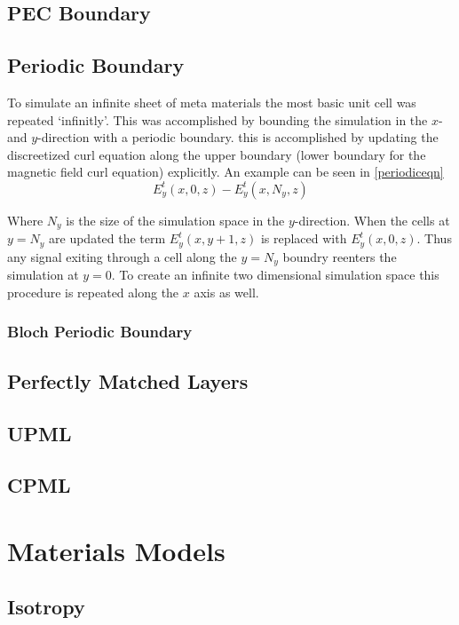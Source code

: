 \documentclass[./JimHeneghanDissertation.tex]{subfiles}
\begin{document}
			\subsection{PEC Boundary}

			\subsection{Periodic Boundary}
				To simulate an infinite sheet of meta materials the most basic unit cell was repeated `infinitly'. This was accomplished by bounding the simulation in the $x$- and $y$-direction with a periodic boundary. this is accomplished by updating the discreetized curl equation along the upper boundary (lower boundary for the magnetic field curl equation) explicitly. An example can be seen in \eqref{periodiceqn}
			\begin{equation} \label{periodiceqn}
				E_{y}^{t}(x,0,z) - E_{y}^{t}(x,N_{y},z)
			\end{equation}

				Where $N_{y}$ is the size of the simulation space in the $y$-direction. When the cells at $y=N_{y}$ are updated the term $E_{y}^{t}(x,y+1,z)$ is replaced with $E_{y}^{t}(x,0,z)$. Thus any signal exiting through a cell along the $y=N_{y}$ boundry reenters the simulation at $y=0$. To create an infinite two dimensional simulation space this procedure is repeated along the $x$ axis as well. 

				\subsubsection{Bloch Periodic Boundary}
			\subsection{Perfectly Matched Layers}
			
				\subsection{UPML}
				\subsection{CPML}

		\section{Materials Models}
			\subsection{Isotropy}
\end{document}
